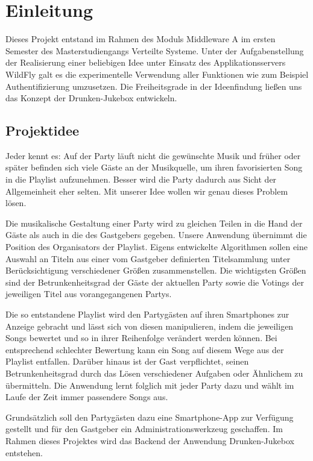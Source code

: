 \section{Einleitung}
Dieses Projekt entstand im Rahmen des Moduls Middleware A im ersten Semester des Masterstudiengangs Verteilte Systeme. Unter der Aufgabenstellung der Realisierung einer beliebigen Idee unter Einsatz des Applikationsservers WildFly galt es die experimentelle Verwendung aller Funktionen wie zum Beispiel Authentifizierung umzusetzen.
Die Freiheitsgrade in der Ideenfindung ließen uns das Konzept der Drunken-Jukebox entwickeln.

\subsection{Projektidee}
Jeder kennt es: Auf der Party läuft nicht die gewünschte Musik und früher oder später befinden sich viele Gäste an der Musikquelle, um ihren favorisierten Song in die Playlist aufzunehmen. Besser wird die Party dadurch aus Sicht der Allgemeinheit eher selten. Mit unserer Idee wollen wir genau dieses Problem lösen.

Die musikalische Gestaltung einer Party wird zu gleichen Teilen in die Hand der Gäste als auch in die des Gastgebers gegeben. Unsere Anwendung übernimmt die Position des Organisators der Playlist. Eigens entwickelte Algorithmen sollen eine Auswahl an Titeln aus einer vom Gastgeber definierten Titelsammlung unter Berücksichtigung verschiedener Größen zusammenstellen. Die wichtigsten Größen sind der Betrunkenheitsgrad der Gäste der aktuellen Party sowie die Votings der jeweiligen Titel aus vorangegangenen Partys.

Die so entstandene Playlist wird den Partygästen auf ihren Smartphones zur Anzeige gebracht und lässt sich von diesen manipulieren, indem die jeweiligen Songs bewertet und so in ihrer Reihenfolge verändert werden können. Bei entsprechend schlechter Bewertung kann ein Song auf diesem Wege aus der Playlist entfallen. Darüber hinaus ist der Gast verpflichtet, seinen Betrunkenheitsgrad durch das Lösen verschiedener Aufgaben oder Ähnlichem zu übermitteln. Die Anwendung lernt folglich mit jeder Party dazu und wählt im Laufe der Zeit immer passendere Songs aus. 

Grundsätzlich soll den Partygästen dazu eine Smartphone-App zur Verfügung gestellt und für den Gastgeber ein Administrationswerkzeug geschaffen. Im Rahmen dieses Projektes wird das Backend der Anwendung Drunken-Jukebox entstehen. 